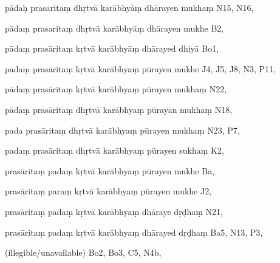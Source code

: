 \begin{marma}[hp03_010]
\item[pādaḥ prasaritaṃ dhṛtvā karābhyāṃ dhārayen mukhaṃ] N15, N16,
\item[pādaṃ prasaritaṃ dhṛtvā karābhyāṃ dhārayen mukhe] B2,
\item[pādaṃ prasāritaṃ kṛtvā karābhyāṃ dhārayed dhiyā] Bo1,  
\item[padaṃ prasāritaṃ kṛtvā karābhyaṃ pūrayen mukhe] J4, J5, J8, N3, P11, 
\item[pādaṃ prasāritaṃ kṛtvā karābhyaṃ pūrayen mukhaṃ] N22,
\item[pādaṃ prasāritaṃ dhṛtvā karābhyaṃ pūrayan mukhaṃ] N18,
\item[pada prasāritaṃ dhṛtvā karābhyaṃ pūrayen mukhaṃ] N23, P7, 
\item[padaṃ prasāritaṃ dhṛtvā karābhyaṃ pūrayen sukhaṃ] K2,
\item[prasāritaṃ padaṃ kṛtvā karābhyaṃ pūrayen mukhe] Ba,
\item[prasāritaṃ paraṃ kṛtvā karābhyaṃ pūrayen mukhe] J2,
\item[prasāritaṃ padaṃ kṛtvā karābhyaṃ dhāraye dṛḍhaṃ] N21,
\item[prasāritaṃ padaṃ kṛtvā karābhyaṃ dhārayed dṛḍhaṃ] Ba5, N13, P3,

\item[(illegible/unavailable)] Bo2, Bo3, C5, N4b, 
  \begin{description}
    \end{description}

  \end{marma}



